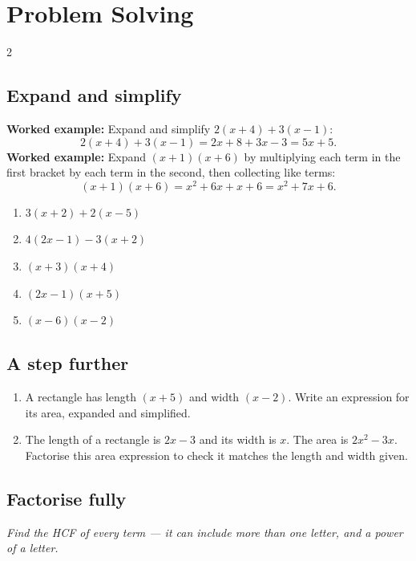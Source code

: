 \documentclass[11pt]{article}
\newcommand{\ans}{\hrulefill}
\newcommand{\anshere}{\par\vspace{0.2em}\noindent\ans\par\vspace{0.2em}}
\begin{document}
\newpage

\section*{Problem Solving}

\begingroup\small
\begin{multicols}{2}
\subsection*{Expand and simplify}
\noindent\textbf{Worked example:} Expand and simplify $2(x+4)+3(x-1)$:
\[2(x+4)+3(x-1) = 2x+8+3x-3 = 5x+5.\]
\noindent\textbf{Worked example:} Expand $(x+1)(x+6)$ by multiplying each term in the
first bracket by each term in the second, then collecting like terms:
\[(x+1)(x+6) = x^2+6x+x+6 = x^2+7x+6.\]
\vspace{0.2em}
\begin{enumerate}[label=(\alph*)]
  \item $3(x+2)+2(x-5)$
  \anshere
  \item $4(2x-1)-3(x+2)$
  \anshere
  \item $(x+3)(x+4)$
  \anshere
  \item $(2x-1)(x+5)$
  \anshere
  \item $(x-6)(x-2)$
  \anshere
\end{enumerate}

\vspace{0.5em}
\subsection*{A step further}
\begin{enumerate}[label=(\alph*)]
  \item A rectangle has length $(x+5)$ and width $(x-2)$. Write an expression for its
    area, expanded and simplified.
  \anshere
  \item The length of a rectangle is $2x-3$ and its width is $x$. The area is
    $2x^2-3x$. Factorise this area expression to check it matches the length and
    width given.
  \anshere
\end{enumerate}

\columnbreak

\subsection*{Factorise fully}
\noindent\textit{Find the HCF of every term --- it can include more than one letter,
and a power of a letter.}


\end{multicols}
\end{document}
